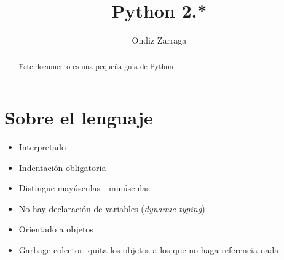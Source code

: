 \documentclass[a4paper,10pt]{article}
\title{Python 2.*}
\author{Ondiz Zarraga}
\begin{document}
\maketitle

\begin{abstract}
Este documento es una pequeña guía de Python 
\end{abstract}

\tableofcontents

\section{Sobre el lenguaje}

\begin{itemize}
    \item Interpretado
    \item Indentación obligatoria
    \item Distingue mayúsculas - minúsculas
    \item No hay declaración de variables (\textit{dynamic typing})
    \item Orientado a objetos  
    \item Garbage colector: quita los objetos a los que no haga referencia nada
\end{itemize}

\newpage 
\end{document}
